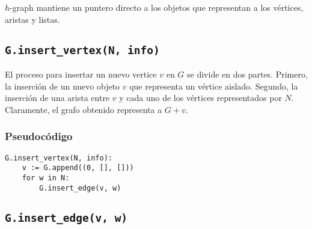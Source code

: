 \documentclass[a4paper,12pt]{article}
\begin{document}
$h$-graph mantiene un puntero directo a los objetos que representan a los vértices, aristas y listas.


\subsection{\texttt{G.insert\_vertex(N, info)}}

El proceso para insertar un nuevo vertice $v$ en $G$ se divide en dos partes.  Primero, la inserción de un nuevo objeto $v$ que representa un vértice aislado.  Segundo, la inserción de una arista entre $v$ y cada uno de los vértices representados por $N$.  Claramente, el grafo obtenido representa a $G + v$.

\subsubsection*{Pseudocódigo}

\begin{lstlisting}
G.insert_vertex(N, info):
    v := G.append((0, [], []))
    for w in N:
        G.insert_edge(v, w)
\end{lstlisting}


\subsection{\texttt{G.insert\_edge(v, w)}}
\end{document}

